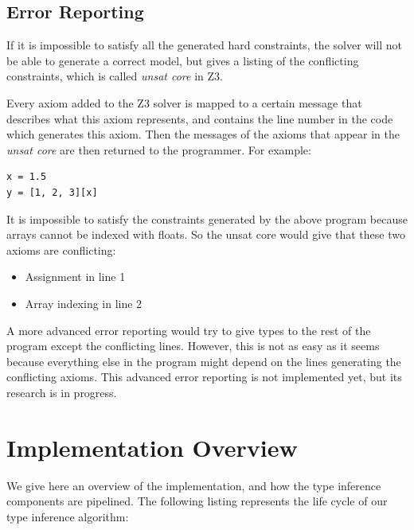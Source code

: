 \subsection{Error Reporting}
If it is impossible to satisfy all the generated hard constraints, the solver will not be able to generate a correct model, but gives a listing of the conflicting constraints, which is called \textit{unsat core} in Z3.

Every axiom added to the Z3 solver is mapped to a certain message that describes what this axiom represents, and contains the line number in the code which generates this axiom. Then the messages of the axioms that appear in the \textit{unsat core} are then returned to the programmer. For example:
\begin{lstlisting}
x = 1.5
y = [1, 2, 3][x]
\end{lstlisting}

It is impossible to satisfy the constraints generated by the above program because arrays cannot be indexed with floats. So the unsat core would give that these two axioms are conflicting:
\begin{itemize}
	\item Assignment in line 1
	\item Array indexing in line 2
\end{itemize}

A more advanced error reporting would try to give types to the rest of the program except the conflicting lines. However, this is not as easy as it seems because everything else in the program might depend on the lines generating the conflicting axioms. This advanced error reporting is not implemented yet, but its research is in progress.

\section{Implementation Overview}
We give here an overview of the implementation, and how the type inference components are pipelined. The following listing represents the life cycle of our type inference algorithm:

